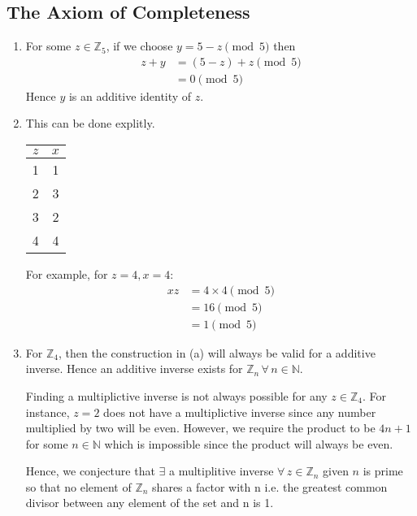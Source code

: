 \setcounter{subsection}{2}
\subsection{The Axiom of Completeness}

\begin{enumerate}[label=(\alph*)]

    \item
    For some $z \in \mathbb{Z}_5$, if we choose $y = 5 - z \pmod 5$ then
    \begin{align*}
        z + y   &= (5 - z) + z \pmod 5 \\
                &= 0 \pmod 5 
    \end{align*}
    Hence $y$ is an additive identity of $z$.

    \item
    This can be done explitly. \\
    \begin{center}
        \begin{tabular}{cc}
            \toprule
            $z$ & $x$ \\
            \midrule
            1 & 1 \\
            2 & 3 \\
            3 & 2 \\
            4 & 4 \\
            \bottomrule
        \end{tabular}
    \end{center}

    For example, for $z = 4, x = 4$:
    \begin{align*}
        xz  &= 4 \times 4 \pmod 5 \\
            &= 16 \pmod 5 \\
            &= 1 \pmod 5
    \end{align*}

    \item
    For $\mathbb{Z}_4$, then the construction in (a) will always be valid for a additive
    inverse. Hence an additive inverse exists for $\mathbb{Z}_n \, \forall \, n \in \mathbb N$. 

    Finding a multiplictive inverse is not always possible for any $z \in \mathbb Z_4$. For
    instance, $z = 2$ does not have a multiplictive inverse since any number multiplied
    by two will be even. However, we require the product to be $4n+1$ for some $n \in \mathbb N$
    which is impossible since the product will always be even.

    Hence, we conjecture that $\exists$ a multiplitive inverse $\forall \, z \in \mathbb Z_n$
    given $n$ is prime so that no element of $\mathbb Z_n$ shares a factor with n i.e. the greatest
    common divisor between any element of the set and n is 1.
    
\end{enumerate}

